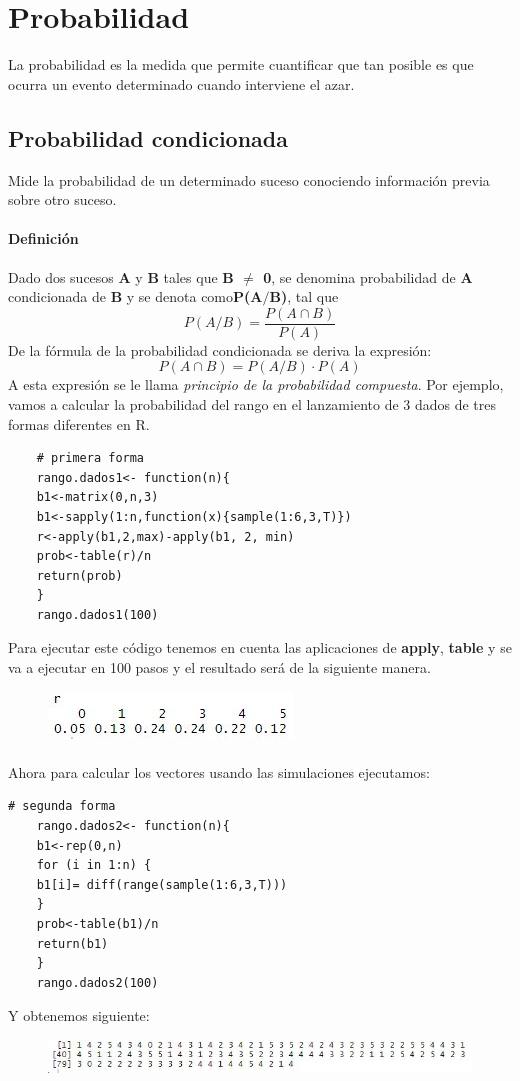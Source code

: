 \documentclass[12pt,hidelinks]{article}
\begin{document}
\section{Probabilidad}
\vspace{10cm}
La probabilidad es la medida que permite cuantificar que tan posible es que ocurra un evento determinado cuando interviene el azar.
\subsection{Probabilidad condicionada} 
Mide la probabilidad de un determinado suceso conociendo información previa sobre otro suceso.
\paragraph{Definición}Dado dos sucesos \textbf{A} y \textbf{B} tales que \textbf{B $\neq$ 0}, se denomina probabilidad de \textbf{A} condicionada de \textbf{B} y se denota como\textbf{P(A$/$B)}, tal que
$$
	P(A/B)=\frac{P(A\cap B)}{P(A)}
$$
De la fórmula de la probabilidad condicionada se deriva la expresión:
$$
	P(A \cap B)=P(A/B) \cdot P(A)
$$
A esta expresión se le llama \textit{principio de la probabilidad compuesta}. Por ejemplo, vamos a calcular la probabilidad del rango en el lanzamiento de 3 dados de tres formas diferentes en R.
\begin{lstlisting}
	# primera forma
	rango.dados1<- function(n){
	b1<-matrix(0,n,3)
	b1<-sapply(1:n,function(x){sample(1:6,3,T)})
	r<-apply(b1,2,max)-apply(b1, 2, min)
	prob<-table(r)/n
	return(prob)
	}
	rango.dados1(100)
\end{lstlisting} 
Para ejecutar este código tenemos en cuenta las aplicaciones de \textbf{apply}, \textbf{table} y se va a ejecutar en 100 pasos y el resultado será de la siguiente manera.
\begin{figure}[h!]
	\centering
	\includegraphics[width=0.5\linewidth]{images/3/probabilidad_condicionada.jpeg}
\end{figure}
\paragraph{}Ahora para calcular los vectores usando las simulaciones ejecutamos:
\begin{lstlisting}[frame=single]
	# segunda forma 
	rango.dados2<- function(n){
	b1<-rep(0,n)
	for (i in 1:n) {
	b1[i]= diff(range(sample(1:6,3,T)))
	}
	prob<-table(b1)/n
	return(b1)
	}
	rango.dados2(100)
\end{lstlisting}
Y obtenemos siguiente:
\begin{figure}[h!]
	\centering
	\includegraphics[width=\linewidth]{images/3/probabilidad_condicionada1.JPG}
\end{figure}
\end{document}
